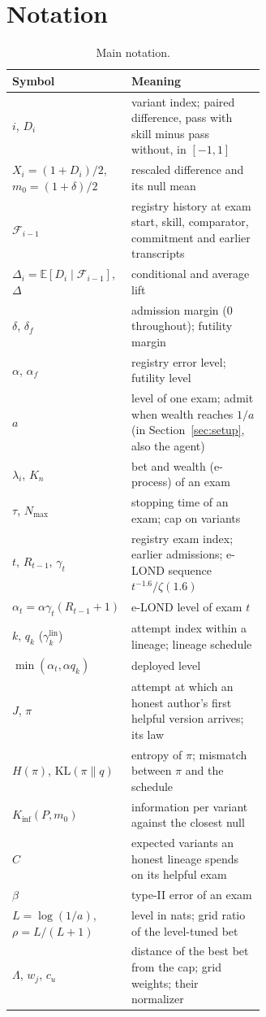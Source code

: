 \section{Notation}
\label{app:notation}

\begin{table}[H]
\centering\small
\caption{Main notation.}
\label{tab:notation}
\begin{tabular}{@{}l>{\raggedright\arraybackslash}p{0.62\linewidth}@{}}
\toprule
Symbol & Meaning \\
\midrule
$i$, $D_i$ & variant index; paired difference, pass with skill minus pass without, in $[-1,1]$ \\
$X_i=(1+D_i)/2$, $m_0=(1+\delta)/2$ & rescaled difference and its null mean \\
$\mathcal F_{i-1}$ & registry history at exam start, skill, comparator, commitment and earlier transcripts \\
$\Delta_i=\mathbb E[D_i\mid\mathcal F_{i-1}]$, $\Delta$ & conditional and average lift \\
$\delta$, $\delta_f$ & admission margin (0 throughout); futility margin \\
$\alpha$, $\alpha_f$ & registry error level; futility level \\
$a$ & level of one exam; admit when wealth reaches $1/a$ (in Section~\ref{sec:setup}, also the agent) \\
$\lambda_i$, $K_n$ & bet and wealth (e-process) of an exam \\
$\tau$, $N_{\max}$ & stopping time of an exam; cap on variants \\
$t$, $R_{t-1}$, $\gamma_t$ & registry exam index; earlier admissions; e-LOND sequence $t^{-1.6}/\zeta(1.6)$ \\
$\alpha_t=\alpha\gamma_t(R_{t-1}+1)$ & e-LOND level of exam $t$ \\
$k$, $q_k$ ($\gamma^{\text{lin}}_k$) & attempt index within a lineage; lineage schedule \\
$\min(\alpha_t,\alpha q_k)$ & deployed level \\
$J$, $\pi$ & attempt at which an honest author's first helpful version arrives; its law \\
$H(\pi)$, $\mathrm{KL}(\pi\|q)$ & entropy of $\pi$; mismatch between $\pi$ and the schedule \\
$K_{\inf}(P,m_0)$ & information per variant against the closest null \\
$C$ & expected variants an honest lineage spends on its helpful exam \\
$\beta$ & type-II error of an exam \\
$L=\log(1/a)$, $\rho=L/(L+1)$ & level in nats; grid ratio of the level-tuned bet \\
$\Lambda$, $w_j$, $c_u$ & distance of the best bet from the cap; grid weights; their normalizer \\
\bottomrule
\end{tabular}
\end{table}
